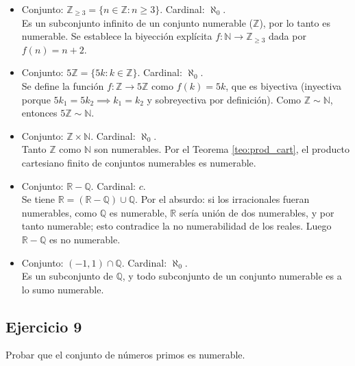 \documentclass[11pt, a4paper]{article}
\begin{document}
\begin{itemize}
    \item Conjunto: $\mathbb{Z}_{\ge 3} = \{ n \in \mathbb{Z} : n \ge 3 \}$.
    Cardinal: $\aleph_0$.
    \\ Es un subconjunto infinito de un conjunto numerable ($\mathbb{Z}$), por lo tanto es
    numerable. Se establece la biyección explícita $f: \mathbb{N} \to \mathbb{Z}_{\ge 3}$ dada
    por $f(n) = n + 2$.

    \item Conjunto: $5\mathbb{Z} = \{ 5k : k \in \mathbb{Z} \}$.
    Cardinal: $\aleph_0$.
    \\ Se define la función $f: \mathbb{Z} \to 5\mathbb{Z}$ como $f(k) = 5k$, que es biyectiva
    (inyectiva porque $5k_1=5k_2 \implies k_1=k_2$ y sobreyectiva por definición). Como
    $\mathbb{Z} \sim \mathbb{N}$, entonces $5\mathbb{Z} \sim \mathbb{N}$.

    \item Conjunto: $\mathbb{Z} \times \mathbb{N}$.
    Cardinal: $\aleph_0$.
    \\ Tanto $\mathbb{Z}$ como $\mathbb{N}$ son numerables. Por el Teorema \ref{teo:prod_cart}, el
    producto cartesiano finito de conjuntos numerables es numerable.

    \item Conjunto: $\mathbb{R} - \mathbb{Q}$.
    Cardinal: $c$.
    \\ Se tiene $\mathbb{R} = (\mathbb{R} - \mathbb{Q}) \cup \mathbb{Q}$. Por el absurdo: si los irracionales fueran
    numerables, como $\mathbb{Q}$ es numerable, $\mathbb{R}$ sería unión de dos numerables, y por
    tanto numerable; esto contradice la no numerabilidad de los reales. Luego
    $\mathbb{R} - \mathbb{Q}$ es no numerable.

    \item Conjunto: $(-1, 1) \cap \mathbb{Q}$.
    Cardinal: $\aleph_0$.
    \\ Es un subconjunto de $\mathbb{Q}$, y todo subconjunto de un conjunto numerable es a lo sumo
    numerable.
\end{itemize}

\subsection*{Ejercicio 9}

Probar que el conjunto de números primos es numerable.
\end{document}

